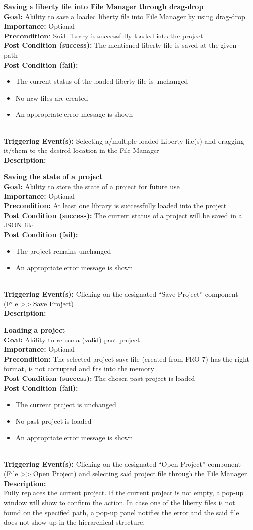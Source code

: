 \documentclass[10pt,a4paper]{report}
\newcommand{\precondition}[1]{
    \textbf{Precondition: } #1 \leavevmode \\
}
\newcommand{\FRODescription}[8]{
    \textbf{#1} \leavevmode \\
    \textbf{Goal: } #2 \leavevmode \\
    \textbf{Importance: } #3 \leavevmode \\
    \precondition{#4}
    \textbf{Post Condition (success): } #5 \leavevmode \\
    \textbf{Post Condition (fail): } #6 \leavevmode \\
    \textbf{Triggering Event(s): } #7 \leavevmode \\
    \textbf{Description: } \leavevmode \\
    #8}
\begin{document}
\begin{FRO}
    \item \FRODescription{Saving a liberty file into File Manager through drag-drop}
    {Ability to save a loaded liberty file into File Manager by using drag-drop}
    {Optional}
    {Said library is successfully loaded into the project}
    {The mentioned liberty file is saved at the given path}
    {\begin{itemize}
        \item The current status of the loaded liberty file is unchanged
        \item No new files are created
        \item An appropriate error message is shown
    \end{itemize}}
    {Selecting a/multiple loaded Liberty file(s) and dragging it/them to the desired location in the File Manager}
    \item \FRODescription{Saving the state of a project}
    {Ability to store the state of a project for future use}
    {Optional}
    {At least one library is successfully loaded into the project}
    {The current status of a project will be saved in a JSON file}
    {\begin{itemize}
        \item The project remains unchanged
        \item An appropriate error message is shown
    \end{itemize}}
    {Clicking on the designated “Save Project” component (File >> Save Project)}
    \item \FRODescription{Loading a project}
    {Ability to re-use a (valid) past project}
    {Optional}
    {The selected project save file (created from FRO-7) has the right format, is not corrupted and fits into the memory}
    {The chosen past project is loaded}
    {\begin{itemize}
        \item The current project is unchanged
        \item No past project is loaded
        \item An appropriate error message is shown
    \end{itemize}}
    {Clicking on the designated “Open Project” component (File >> Open Project) and selecting said project file through the File Manager}
    {Fully replaces the current project. If the current project is not empty, a pop-up window will show to confirm the action. In case one of the liberty files is not found on the specified path, a pop-up panel notifies the error and the said file does not show up in the hierarchical structure.}

\end{FRO}
\end{document}
